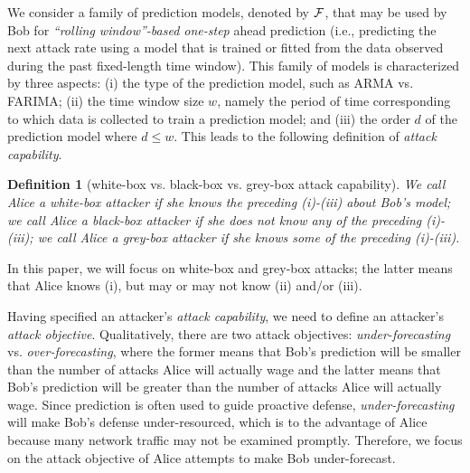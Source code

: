 \documentclass[journal]{IEEEtran}
\newtheorem{definition}{Definition}
\begin{document}
We consider a family of prediction models, denoted by ${\cal F}$, that may be used by Bob for {\em ``rolling window''-based one-step} ahead prediction (i.e., predicting the next attack rate using a model that is trained or fitted from the data observed during the past fixed-length time window). This family of models is characterized by three aspects: (i) the type of the prediction model, such as ARMA vs. FARIMA; (ii) the time window size $w$, namely the period of time corresponding to which data is collected to train a prediction model; and (iii) the order $d$ of the prediction model where $d\leq w$. This leads to the following definition of {\em attack capability}.

\begin{definition}[white-box vs. black-box vs. grey-box attack capability]\label{def:wbg}
We call Alice a {\em white-box} attacker if she knows the preceding (i)-(iii) about Bob's model; we call Alice a {\em black-box} attacker if she does not know any of the preceding (i)-(iii); we call Alice a grey-box attacker if she knows some of the preceding (i)-(iii).  
\end{definition}

{\color{purple}In this paper, we will focus on white-box and grey-box attacks; the latter means that Alice knows (i), but may or may not know (ii) and/or (iii).}



Having specified an attacker's {\em attack capability}, we need to define an attacker's {\em attack objective}. Qualitatively, there are two attack objectives: {\em under-forecasting} vs. {\em over-forecasting}, where the former means that Bob's prediction will be smaller than the number of attacks Alice will actually wage and the latter means that Bob's prediction will be greater than the number of attacks Alice will actually wage. 
Since prediction is often used to guide proactive defense, {\em under-forecasting} will make Bob's defense under-resourced, which is to the advantage of Alice because many network traffic may not be examined promptly. Therefore, we focus on the attack objective of Alice attempts to make Bob under-forecast.
\end{document}
